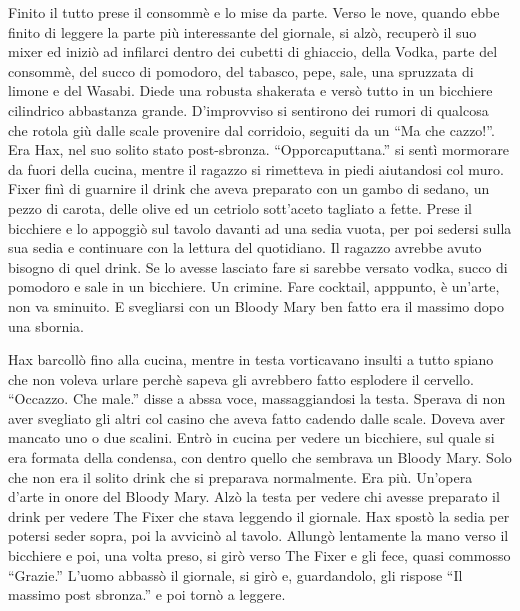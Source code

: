     Finito il tutto prese il consommè e lo mise da parte. Verso le nove,
    quando ebbe finito di leggere la parte più interessante del giornale,
    si alzò, recuperò il suo mixer ed iniziò ad infilarci dentro dei
    cubetti di ghiaccio, della Vodka, parte del consommè, del succo di
    pomodoro, del tabasco, pepe, sale, una spruzzata di limone e del
    Wasabi. Diede una robusta shakerata e versò tutto in un bicchiere
    cilindrico abbastanza grande. D'improvviso si sentirono dei rumori di
    qualcosa che rotola giù dalle scale provenire dal corridoio, seguiti da
    un ``Ma che cazzo!''. Era Hax, nel suo solito stato post-sbronza.
    ``Opporcaputtana.'' si sentì mormorare da fuori della cucina, mentre il ragazzo
    si rimetteva in piedi aiutandosi col muro. Fixer finì di guarnire il
    drink che aveva preparato con un gambo di sedano, un pezzo di carota,
    delle olive ed un cetriolo sott'aceto tagliato a fette. Prese il
    bicchiere e lo appoggiò sul tavolo davanti ad una sedia vuota, per poi
    sedersi sulla sua sedia e continuare con la lettura del quotidiano. Il
    ragazzo avrebbe avuto bisogno di quel drink. Se lo avesse lasciato fare
    si sarebbe versato vodka, succo di pomodoro e sale in un bicchiere. Un
    crimine. Fare cocktail, apppunto, è un'arte, non va sminuito. E
    svegliarsi con un Bloody Mary ben fatto era il massimo dopo una
    sbornia.

    Hax barcollò fino alla cucina, mentre in testa vorticavano insulti a
    tutto spiano che non voleva urlare perchè sapeva gli avrebbero fatto
    esplodere il cervello. ``Occazzo. Che male.'' disse a abssa voce,
    massaggiandosi la testa. Sperava di non aver svegliato gli altri col
    casino che aveva fatto cadendo dalle scale. Doveva aver mancato uno o
    due scalini. Entrò in cucina per vedere un bicchiere, sul quale si era
    formata della condensa, con dentro quello che sembrava un Bloody Mary.
    Solo che non era il solito drink che si preparava normalmente. Era più.
    Un'opera d'arte in onore del Bloody Mary. Alzò la testa per vedere chi
    avesse preparato il drink per vedere The Fixer che stava leggendo il
    giornale. Hax spostò la sedia per potersi seder sopra, poi la avvicinò
    al tavolo. Allungò lentamente la mano verso il bicchiere e poi, una
    volta preso, si girò verso The Fixer e gli fece, quasi commosso
    ``Grazie.'' L'uomo abbassò il giornale, si girò e, guardandolo, gli
    rispose ``Il massimo post sbronza.'' e poi tornò a leggere.

